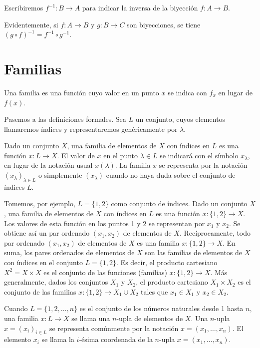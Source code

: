Escribiremos \(f^{-1}: B \to A\) para indicar la inversa de la biyección \(f: A \to B\).

Evidentemente, si \(f: A \to B\) y \(g: B \to C\) son biyecciones, se tiene \((g \circ f)^{-1} = f^{-1} \circ g^{-1}\).

\section{Familias}

Una familia es una función cuyo valor en un punto \(x\) se indica con \(f_x\) en lugar de \(f(x)\).

Pasemos a las definiciones formales.
Sea \(L\) un conjunto, cuyos elementos llamaremos índices y representaremos genéricamente por \(\lambda\).

Dado un conjunto \(X\), una familia de elementos de \(X\) con índices en \(L\) es una función \(x: L \to X\). El valor de \(x\) en el punto \(\lambda \in L\) se indicará con el símbolo \(x_\lambda\), en lugar de la notación usual \(x(\lambda)\). La familia \(x\) se representa por la notación \((x_\lambda)_{\lambda \in L}\) o simplemente \((x_\lambda)\) cuando no haya duda sobre el conjunto de índices \(L\).

Tomemos, por ejemplo, \(L = \{1, 2\}\) como conjunto de índices. Dado un conjunto \(X\), una familia de elementos de \(X\) con índices en \(L\) es una función \(x: \{1, 2\} \to X\). Los valores de esta función en los puntos 1 y 2 se representan por \(x_1\) y \(x_2\). Se obtiene así un par ordenado \((x_1, x_2)\) de elementos de \(X\). Recíprocamente, todo par ordenado \((x_1, x_2)\) de elementos de \(X\) es una familia \(x: \{1, 2\} \to X\). En suma, los pares ordenados de elementos de \(X\) son las familias de elementos de \(X\) con índices en el conjunto \(L = \{1, 2\}\). Es decir, el producto cartesiano \(X^2 = X \times X\) es el conjunto de las funciones (familias) \(x: \{1, 2\} \to X\). Más generalmente, dados los conjuntos \(X_1\) y \(X_2\), el producto cartesiano \(X_1 \times X_2\) es el conjunto de las familias \(x: \{1, 2\} \to X_1 \cup X_2\) tales que \(x_1 \in X_1\) y \(x_2 \in X_2\).

Cuando \(L = \{1, 2, \dots, n\}\) es el conjunto de los números naturales desde 1 hasta \(n\), una familia \(x: L \to X\) se llama una \(n\)-upla de elementos de \(X\). Una \(n\)-upla \(x = (x_i)_{i \in L}\) se representa comúnmente por la notación \(x = (x_1, \dots, x_n)\). El elemento \(x_i\) se llama la \(i\)-ésima coordenada de la \(n\)-upla \(x = (x_1, \dots, x_n)\).

